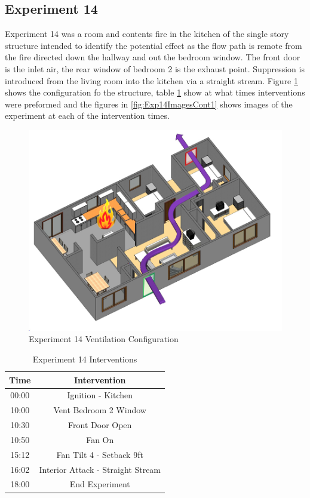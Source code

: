 \documentclass{article}
\begin{document}
\subsection{Experiment 14}
Experiment 14 was a room and contents fire in the kitchen of the single story structure intended to identify the potential effect as the flow path is remote from the fire directed down the hallway and out the bedroom window. The front door is the inlet air, the rear window of bedroom 2 is the exhaust point. Suppression is introduced from the living room into the kitchen via a straight stream. Figure \ref{fig:Exp14VentConfig} shows the configuration fo the structure, table \ref{Table:Exp14Interventions} show at what times interventions were preformed and the figures in \ref{fig:Exp14ImagesCont1} shows images of the experiment at each of the intervention times.

\begin{figure}[h!]
	\centering
	\includegraphics[width=5in]{0_Images/FireExperiments/Single_Story/Experiment_14.jpg}
	\caption{Experiment 14 Ventilation Configuration}
	\label{fig:Exp14VentConfig}
\end{figure}

\begin{table}[H]
	\centering
	\caption{Experiment 14 Interventions}
	\begin{tabular}{|c|c|} 
		\hline
		Time & Intervention \\ \hline \hline
		00:00 & Ignition - Kitchen \\ \hline
		10:00 & Vent Bedroom 2 Window \\ \hline
		10:30 & Front Door Open \\ \hline
		10:50 & Fan On \\ \hline
		15:12 & Fan Tilt 4 - Setback 9ft \\ \hline
		16:02 & Interior Attack - Straight Stream \\ \hline
		18:00 & End Experiment \\ \hline
	\end{tabular}
	\label{Table:Exp14Interventions}
\end{table}
\end{document}
